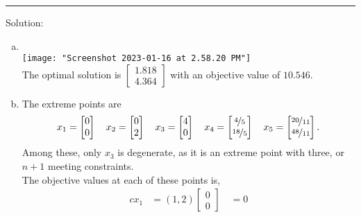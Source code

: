 \documentclass[12pt]{amsart}
\begin{document}
\medskip \hrule \medskip
Solution:

\begin{enumerate}[a.]
	\item \phantom{text} \\	
	\texttt{[image: "Screenshot 2023-01-16 at 2.58.20 PM"]} \\
	
	The optimal solution is \(\begin{bmatrix} 1.818 \\ 4.364 \end{bmatrix}\)
	with an objective value of \(10.546\).
	\item 
	The extreme points are
	\begin{align*}
		x_1 = \begin{bmatrix} 0 \\ 0 \end{bmatrix} \quad
		x_2 = \begin{bmatrix} 0 \\ 2 \end{bmatrix} \quad
		x_3 = \begin{bmatrix} 4 \\ 0 \end{bmatrix} \quad
		x_4 = \begin{bmatrix} \nicefrac{4}{5} \\ \nicefrac{18}{5} \end{bmatrix} \quad
		x_5 = \begin{bmatrix} \nicefrac{20}{11}\\ \nicefrac{48}{11} \end{bmatrix}.
	\end{align*}
	Among these, only \(x_3\) is degenerate, as it is an extreme point with three, or \(n+1\) meeting constraints. \\
	The objective values at each of these points is,
	\begin{align*}
		cx_1 &= (1,2)\begin{bmatrix} 0 \\ 0 \end{bmatrix} \quad  = 0 \\

\end{align*}
\end{enumerate}
\end{document}
